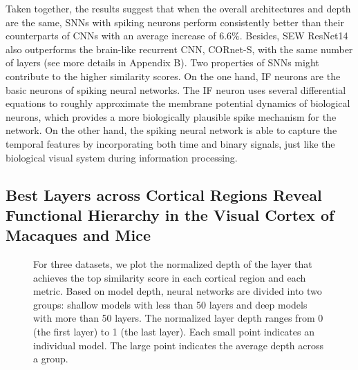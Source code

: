 \documentclass[letterpaper]{article} %
\begin{document}
Taken together, the results suggest that when the overall architectures and depth are the same, SNNs with spiking neurons perform consistently better than their counterparts of CNNs with an average increase of $6.6\%$. Besides, SEW ResNet14 also outperforms the brain-like recurrent CNN, CORnet-S, with the same number of layers (see more details in Appendix B). Two properties of SNNs might contribute to the higher similarity scores. On the one hand, IF neurons are the basic neurons of spiking neural networks. The IF neuron uses several differential equations to roughly approximate the membrane potential dynamics of biological neurons, which provides a more biologically plausible spike mechanism for the network. On the other hand, the spiking neural network is able to capture the temporal features by incorporating both time and binary signals, just like the biological visual system during information processing.

\subsection{Best Layers across Cortical Regions Reveal Functional Hierarchy in the Visual Cortex of Macaques and Mice}

\begin{figure}[t]
\centering
{}
\caption{For three datasets, we plot the normalized depth of the layer that achieves the top similarity score in each cortical region and each metric. Based on model depth, neural networks are divided into two groups: shallow models with less than 50 layers and deep models with more than 50 layers. The normalized layer depth ranges from 0 (the first layer) to 1 (the last layer). Each small point indicates an individual model. The large point indicates the average depth across a group.}
\label{Fig.best_layer}
\end{figure}
\end{document}
